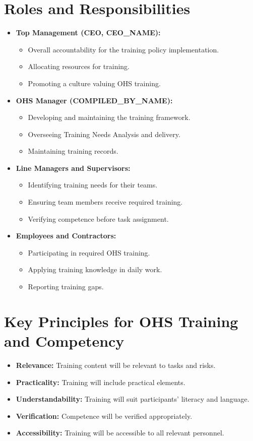\documentclass[11pt]{article}
\newcommand{\compilerName}{{{COMPILED_BY_NAME}}}
\begin{document}
\section{Roles and Responsibilities}
\begin{itemize}
    \item \textbf{Top Management (CEO, {{CEO_NAME}}):}
    \begin{itemize}
        \item Overall accountability for the training policy implementation.
        \item Allocating resources for training.
        \item Promoting a culture valuing OHS training.
    \end{itemize}
    \item \textbf{OHS Manager (\compilerName):}
    \begin{itemize}
        \item Developing and maintaining the training framework.
        \item Overseeing Training Needs Analysis and delivery.
        \item Maintaining training records.
    \end{itemize}
    \item \textbf{Line Managers and Supervisors:}
    \begin{itemize}
        \item Identifying training needs for their teams.
        \item Ensuring team members receive required training.
        \item Verifying competence before task assignment.
    \end{itemize}
    \item \textbf{Employees and Contractors:}
    \begin{itemize}
        \item Participating in required OHS training.
        \item Applying training knowledge in daily work.
        \item Reporting training gaps.
    \end{itemize}
\end{itemize}

\section{Key Principles for OHS Training and Competency}
\begin{itemize}
    \item \textbf{Relevance:} Training content will be relevant to tasks and risks.
    \item \textbf{Practicality:} Training will include practical elements.
    \item \textbf{Understandability:} Training will suit participants’ literacy and language.
    \item \textbf{Verification:} Competence will be verified appropriately.
    \item \textbf{Accessibility:} Training will be accessible to all relevant personnel.
\end{itemize}
\end{document}
